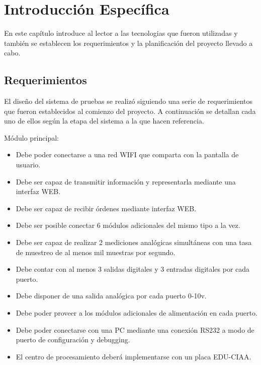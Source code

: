 \chapter{Introducción Específica} %

\label{Chapter2}

En este capítulo introduce al lector a las tecnologias que fueron utilizadas y también se establecen los requerimientos y la planificación del proyecto llevado a cabo.


\section{Requerimientos}
El diseño del sistema de pruebas se realizó siguiendo una serie de requerimientos que fueron establecidos al comienzo del proyecto. A continuación se detallan cada uno de ellos según la etapa del sistema a la que hacen referencia.

Módulo principal:

\begin{itemize}
	\item Debe poder conectarse a una red WIFI que comparta con la pantalla de usuario.
	\item Debe ser capaz de transmitir información y representarla mediante una interfaz WEB.
	\item Debe ser capaz de recibir órdenes mediante interfaz WEB.
	\item Debe ser posible conectar 6 módulos adicionales del mismo tipo a la vez.
	\item Debe ser capaz de realizar 2 mediciones analógicas simultáneas con una tasa de 	muestreo de al menos mil muestras por segundo.
	\item Debe contar con al menos 3 salidas digitales y 3 entradas digitales por cada puerto. 
	\item Debe disponer de una salida analógica por cada puerto 0-10v.	
	\item Debe poder proveer a los módulos adicionales de alimentación en cada puerto.
	\item Debe poder conectarse con una PC mediante una conexión RS232 a modo de 		puerto de configuración y debugging.
	\item El centro de procesamiento deberá implementarse con un placa EDU-CIAA.
	
\end{itemize}

